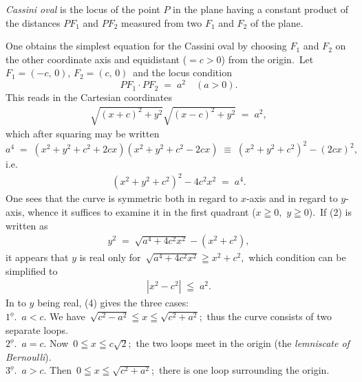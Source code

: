 \documentclass[12pt]{article}
\theoremstyle{definition}
\begin{document}
{\em Cassini oval}\; is the locus of the point $P$ in the plane having a constant product of the distances $PF_1$ and $PF_2$ measured from two  $F_1$ and $F_2$ of the plane.

One obtains the simplest equation for the Cassini oval by choosing $F_1$ and $F_2$ on the other coordinate axis and equidistant ($= c > 0$) from the origin.\, Let\, $F_1 = (-c,\,0)$,\; $F_2 = (c,\,0)$\, and the locus condition
$$PF_1 \cdot PF_2 \;=\; a^2 \quad (a > 0).$$
This reads in the Cartesian coordinates
\begin{align}
\sqrt{(x+c)^2+y^2}\sqrt{(x-c)^2+y^2} \;=\; a^2,
\end{align}
which after squaring may be written
$$a^4 \;=\; (x^2\!+\!y^2\!+\!c^2\!+\!2cx)(x^2\!+\!y^2\!+\!c^2\!-\!2cx) \;\equiv\; (x^2\!+\!y^2\!+\!c^2)^2-(2cx)^2,$$
i.e.
\begin{align}
(x^2\!+\!y^2\!+\!c^2)^2-4c^2x^2 \;=\; a^4.
\end{align}
One sees that the curve is symmetric both in regard to $x$-axis and in regard to $y$-axis, whence it suffices to examine it in the first quadrant ($x \geqq 0$,\, $y \geqq 0$).\, If (2) is written as
\begin{align}
y^2 \;=\; \sqrt{a^4\!+\!4c^2x^2}-(x^2\!+\!c^2),
\end{align}
it appears that $y$ is real only for\, $\sqrt{a^4\!+\!4c^2x^2} \geqq x^2\!+\!c^2$,\, which condition can be simplified to
\begin{align}
|x^2\!-\!c^2| \;\leqq\; a^2.
\end{align}
In  to $y$ being real, (4) gives the three cases:\\
$1^{\underline{o}}$.\, $a < c$.\; We have\, $\sqrt{c^2\!-\!a^2} \leqq x \leqq \sqrt{c^2\!+\!a^2}$;\, thus the curve consists of two separate loops.\\
$2^{\underline{o}}$.\, $a = c$.\; Now\, $0 \leqq x \leqq c\sqrt{2}$;\, the two loops meet in the origin (the {\em lemniscate of Bernoulli}).\\
$3^{\underline{o}}$.\, $a > c$.\; Then\, $0 \leqq x \leqq \sqrt{c^2\!+\!a^2}$;\, there is one loop surrounding the origin.
\end{document}
